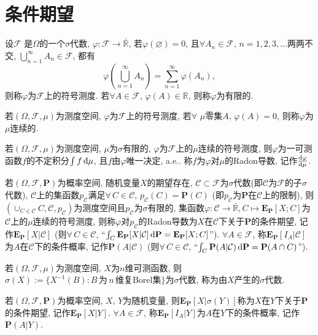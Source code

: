 \chapter{条件期望}

\def\F{\mathcal{F}}
\begin{definition}
    设$\F$ 是$\Omega$的一个$\sigma$代数, $\varphi:\F\to\bar{\mathbb{R} }$, 若$\varphi(\varnothing )=0$, 且$\forall A_n\in\F$, $n=1,2,3,\dots$两两不交, $\bigcup_{n=1}^{\infty}A_n\in\F$, 都有\begin{equation*}
        \varphi\left(\bigcup_{n=1}^{\infty}A_n\right)=\sum_{n=1}^{\infty}\varphi\left(A_n\right),
    \end{equation*}则称$\varphi$为$\F$上的符号测度. 若$\forall A\in\F$, $\varphi(A)\in\mathbb{R}$, 则称$\varphi$为有限的.
\end{definition}

\def\s{$(\Omega,\F,\mu)$}
\def\R{\mathbb{R}}
\begin{definition}
    若\s{}为测度空间, $\varphi$为$\F$上的符号测度, 若$\forall$ $\mu$零集$A$, $\varphi(A)=0$, 则称$\varphi$为$\mu$连续的.
\end{definition}

\begin{definition}
    若\s{}为测度空间, $\mu$为$\sigma$有限的, $\varphi$为$\F$上的$\mu$连续的符号测度, 则$\varphi$为一可测函数$f$的不定积分$\int f\,\mathrm{d}\mu$, 且$f$由$\varphi$唯一决定, a.e.. 称$f$为$\varphi$对$\mu$的Radon导数, 记作$\frac{\mathrm{d} \varphi}{\mathrm{d}\mu}$.
\end{definition}

\def\P{\mathbf{P}}
\def\E{\mathbf{E}}
\def\C{\mathcal{C}}
\begin{definition}
    若$(\Omega,\F,\P)$为概率空间, 随机变量$X$的期望存在, $\C\subset\F$为$\sigma$代数(即$\C$为$\F$的子$\sigma$代数), $\C$上的集函数$p_\C$满足$\forall\,C\in\C$, $p_\C(C)=\P(C)$ (即$p_\C$为$\P$在$\C$上的限制), 则$(\cup_{C\in\C}C,\C,p_\C)$为测度空间且$p_\C$为$\sigma$有限的, 集函数$\varphi:\C\to\bar{\R},C\mapsto\E_\P[X;C]$为$\C$上的$\mu$连续的符号测度, 则称$\varphi$对$p_\C$的Radon导数为$X$在$\C$下关于$\P$的条件期望, 记作$\E_\P[X|\C]$ (则$\forall\,C\in\C$, ``$\int_C\E_\P[X|\C]\,\d\P=\E_\P[X;C]$''). $\forall A\in\F$, 称$\E_\P[I_A|\C]$为$A$在$\C$下的条件概率, 记作$\P(A|\C)$ (则$\forall\,C\in\C$, ``$\int_C\P(A|\C)\,\d\P=\P(A\cap C)$'').
\end{definition}

\begin{definition}
    若$(\Omega,\mathcal{F},\mu)$为测度空间, $X$为$n$维可测函数, 则$\sigma(X):=\{X^{-1}(B):B\,\text{为}\,n\,\text{维复Borel集}\}$为$\sigma$代数, 称为由$X$产生的$\sigma$代数.
\end{definition}

\begin{definition}
    若$(\Omega,\F,\P)$为概率空间, $X$, $Y$为随机变量, 则$\E_\P[X|\sigma(Y)]$称为$X$在$Y$下关于$\P$的条件期望, 记作$\E_\P[X|Y]$. $\forall A\in\F$, 称$\E_\P[I_A|Y]$为$A$在$Y$下的条件概率, 记作$\P(A|Y)$.
\end{definition}
